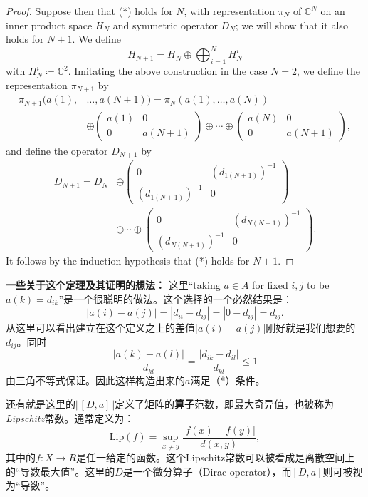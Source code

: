 \begin{proof}
    Suppose then that (*) holds for $N$, with representation $\pi_N$ of $\mathbb{C}^N$ on an inner product space $H_N$ and symmetric operator $D_N$; we will show that it also holds for $N+1$. We define
    \[ 
    H_{N+1}=H_N\oplus\bigoplus_{i=1}^NH_N^i
    \]
    with $H_N^i\coloneq \mathbb{C}^2$. Imitating the above construction in the case $N=2$, we define the representation $\pi_{N+1}$ by
    \[
    \begin{split}
        \pi_{N+1}(a(1),&\ldots,a(N+1))=\pi_N(a(1),\ldots,a(N))\\
        &\oplus\begin{pmatrix}
            a(1)&0\\0&a(N+1)
        \end{pmatrix}\oplus\cdots\oplus
        \begin{pmatrix}
            a(N)&0\\0&a(N+1)
        \end{pmatrix},
    \end{split}
    \]
    and define the operator $D_{N+1}$ by
    \[
    \begin{split}
        D_{N+1}=D_N&\oplus\begin{pmatrix}
        0& (d_{1(N+1)})^{-1}\\(d_{1(N+1)})^{-1}&0
    \end{pmatrix}\\
    &\oplus\cdots\oplus\begin{pmatrix}
        0 & (d_{N(N+1)})^{-1}\\ (d_{N(N+1)})^{-1}&0
    \end{pmatrix}.
    \end{split}   
    \]
    It follows by the induction hypothesis that (*) holds for $N+1$.
\end{proof}

\textbf{一些关于这个定理及其证明的想法：} 这里“taking $a\in A$ for fixed $i, j$ to be $a(k)=d_{ik}$”是一个很聪明的做法。这个选择的一个必然结果是：
\[
|a(i)-a(j)|=|d_{ii}-d_{ij}|=|0-d_{ij}|=d_{ij}.
\]
从这里可以看出建立在这个定义之上的差值$|a(i)-a(j)|$刚好就是我们想要的$d_{ij}$。同时
\[
\frac{|a(k)-a(l)|}{d_{kl}}=\frac{|d_{ik}-d_{il}|}{d_{kl}}\leq 1
\]
由三角不等式保证。因此这样构造出来的$a$满足（*）条件。

还有就是这里的$\Vert[D,a]\Vert$定义了矩阵的\textbf{算子}范数，即最大奇异值，也被称为\textit{Lipschitz}常数。通常定义为：
\[
\text{Lip}(f)=\sup_{x\neq y}\frac{|f(x)-f(y)|}{d(x,y)},
\]
其中的$f:X\rightarrow R$是任一给定的函数。这个Lipschitz常数可以被看成是离散空间上的“导数最大值”。这里的$D$是一个微分算子（Dirac operator），而$[D,a]$则可被视为“导数”。

